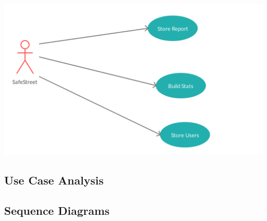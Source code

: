 \documentclass[../RASD.tex]{subfiles}
\begin{document}
                \begin{center}
                    \includegraphics[scale = 1]{assets/safeStreetUC.png}\\[1.6 cm]
                \end{center}
                \newpage
    \subsection{Use Case Analysis}\label{subsec:use-case-analysis}
                
            \subsection{Sequence Diagrams}\label{subsec:sequence-diagrams}
            \newpage
\end{document}
